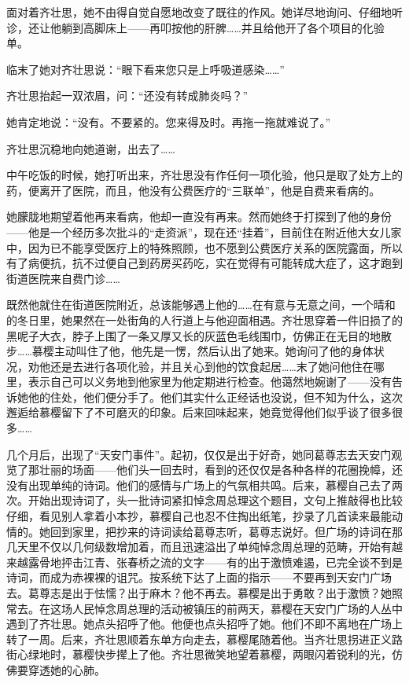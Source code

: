 \par 面对着齐壮思，她不由得自觉自愿地改变了既往的作风。她详尽地询问、仔细地听诊，还让他躺到高脚床上——再叩按他的肝脾……并且给他开了各个项目的化验单。
\par 临末了她对齐壮思说：“眼下看来您只是上呼吸道感染……”
\par 齐壮思抬起一双浓眉，问：“还没有转成肺炎吗？”
\par 她肯定地说：“没有。不要紧的。您来得及时。再拖一拖就难说了。”
\par 齐壮思沉稳地向她道谢，出去了……
\par 中午吃饭的时候，她打听出来，齐壮思没有作任何一项化验，他只是取了处方上的药，便离开了医院，而且，他没有公费医疗的“三联单”，他是自费来看病的。
\par 她朦胧地期望着他再来看病，他却一直没有再来。然而她终于打探到了他的身份——他是一个经历多次批斗的“走资派”，现在还“挂着”，目前住在附近他大女儿家中，因为已不能享受医疗上的特殊照顾，也不愿到公费医疗关系的医院露面，所以有了病便抗，抗不过便自己到药房买药吃，实在觉得有可能转成大症了，这才跑到街道医院来自费门诊……
\par 既然他就住在街道医院附近，总该能够遇上他的……在有意与无意之间，一个晴和的冬日里，她果然在一处街角的人行道上与他迎面相遇。齐壮思穿着一件旧损了的黑呢子大衣，脖子上围了一条又厚又长的灰蓝色毛线围巾，仿佛正在无目的地散步……慕樱主动叫住了他，他先是一愣，然后认出了她来。她询问了他的身体状况，劝他还是去进行各项化验，并且关心到他的饮食起居……末了她问他住在哪里，表示自己可以义务地到他家里为他定期进行检查。他蔼然地婉谢了——没有告诉她他的住处，他们便分手了。他们其实什么正经话也没说，但不知为什么，这次邂逅给慕樱留下了不可磨灭的印象。后来回味起来，她竟觉得他们似乎谈了很多很多……
\par 几个月后，出现了“天安门事件”。起初，仅仅是出于好奇，她同葛尊志去天安门观览了那壮丽的场面——他们头一回去时，看到的还仅仅是各种各样的花圈挽幛，还没有出现单纯的诗词。他们的感情与广场上的气氛相共鸣。后来，慕樱自己去了两次。开始出现诗词了，头一批诗词紧扣悼念周总理这个题目，文句上推敲得也比较仔细，看见别人拿着小本抄，慕樱自己也忍不住掏出纸笔，抄录了几首读来最能动情的。她回到家里，把抄来的诗词读给葛尊志听，葛尊志说好。但广场的诗词在那几天里不仅以几何级数增加着，而且迅速溢出了单纯悼念周总理的范畴，开始有越来越露骨地抨击江青、张春桥之流的文字——有的出于激愤难遏，已完全谈不到是诗词，而成为赤裸裸的诅咒。按系统下达了上面的指示——不要再到天安门广场去。葛尊志是出于怯懦？出于麻木？他不再去。慕樱是出于勇敢？出于激愤？她照常去。在这场人民悼念周总理的活动被镇压的前两天，慕樱在天安门广场的人丛中遇到了齐壮思。她点头招呼了他。他便也点头招呼了她。他们不即不离地在广场上转了一周。后来，齐壮思顺着东单方向走去，慕樱尾随着他。当齐壮思拐进正义路街心绿地时，慕樱快步撵上了他。齐壮思微笑地望着慕樱，两眼闪着锐利的光，仿佛要穿透她的心肺。
